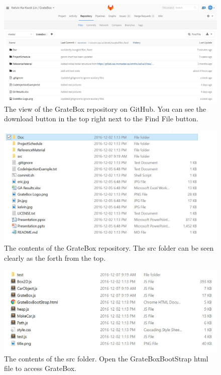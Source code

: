 \documentclass{article}
\begin{document}
\begin{figure}
  \includegraphics[width=\linewidth]{Images/GrateBoxGitRep.JPG}
  \caption{The view of the GrateBox repository on GitHub. You can see the 
download button in the top right next to the Find File button.}
  \label{fig:GitRep1}
\end{figure}

\begin{figure}
  \includegraphics[width=\linewidth]{Images/GrateBoxGitRep2.JPG}
  \caption{The contents of the GrateBox repository. The src folder can be seen 
clearly as the forth from the top.}
  \label{fig:GitRep2}
\end{figure}

\begin{figure}
  \includegraphics[width=\linewidth]{Images/GrateBoxGitRep3.JPG}
  \caption{The contents of the src folder. Open the GrateBoxBootStrap html file 
to access GrateBox.}
  \label{fig:GitRep3}
\end{figure}
\end{document}
